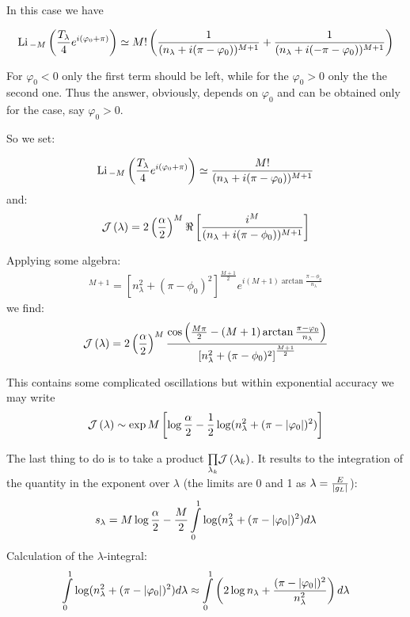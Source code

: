 In this case  we have

\begin{gather}
	\mathrm{Li}\,_{-M}\left(\frac{T_{\lambda}}{4}e^{i(\varphi_{0}+\pi)}\right)\simeq M!\left(\frac{1}{(n_{\lambda}+i(\pi-\varphi_{0}))^{M+1}}+\frac{1}{(n_{\lambda}+i(-\pi-\varphi_{0}))^{M+1}}\right)
\end{gather}

For $ \varphi_0<0 $ only the first term should be left, while for the $ \varphi_0>0 $ only the the second one. Thus the answer, obviously, depends on $ \varphi_0 $ and can be obtained only for the case, say $ \varphi_0>0 $.

So we set:

\begin{gather}
\mathrm{Li}\,_{-M}\left(\frac{T_{\lambda}}{4}e^{i(\varphi_{0}+\pi)}\right)
\simeq \frac{M!}{(n_{\lambda}+i(\pi-\varphi_{0}))^{M+1}}
\end{gather}
and:
\begin{gather}
	\mathcal{J}\left(\lambda\right)
	=
	2\left(\frac{\alpha}{2}\right)^{M}
	\Re
	\left[\frac{i^{M}}{(n_{\lambda}+i(\pi-\phi_{0}))^{M+1}}\right]
\end{gather}

Applying some algebra:
\begin{gather}
	[n_{\lambda}+i(\pi-\phi_{0})]^{M+1}=\left[n_{\lambda}^{2}+(\pi-\phi_{0})^{2}\right]^{\frac{M+1}{2}}e^{i(M+1)\arctan\frac{\pi-\phi_{0}}{n_{\lambda}}}
\end{gather}
 we find:
\begin{gather}
	\mathcal{J}\left(\lambda\right)
	=
	2\left(\frac{\alpha}{2}\right)^{M}\frac{\cos\left(\frac{M\pi}{2}-(M+1)\arctan\frac{\pi-\varphi_{0}}{n_{\lambda}}\right)}{\left[n_{\lambda}^{2}+(\pi-\phi_{0})^{2}\right]^{\frac{M+1}{2}}}
\end{gather}

This contains some complicated oscillations but within exponential
accuracy we may write
\begin{gather}
	\mathcal{J}\left(\lambda\right)
	\sim
	\exp M\left[\log\frac{\alpha}{2}-\frac{1}{2}\log(n_{\lambda}^{2}+(\pi-|\varphi_{0}|)^{2})\right]
\end{gather}

The last thing to do is to take a product $  \underset{\lambda_k}{\prod} \mathcal{J}\left(\lambda_k\right) $. It results to the integration of the quantity in the exponent over $ \lambda $ (the limits are 0 and 1 as $ \lambda = \frac{E}{\left|g_L\right|}$):
\begin{gather}
s_{\lambda} 
 =
M\log\frac{\alpha}{2}
-
\frac{M}{2}
\intop_{0}^{1}\log(n_{\lambda}^{2}+(\pi-|\varphi_{0}|)^{2})d\lambda
\end{gather}
Calculation of the $\lambda$-integral:
\begin{gather}
\intop_{0}^{1}\log(n_{\lambda}^{2}+(\pi-|\varphi_{0}|)^{2})d\lambda
	\approx
	\intop_{0}^{1}\left(2\log n_{\lambda}+\frac{(\pi-|\varphi_{0}|)^{2}}{n_{\lambda}^{2}}\right)d\lambda
\end{gather}

